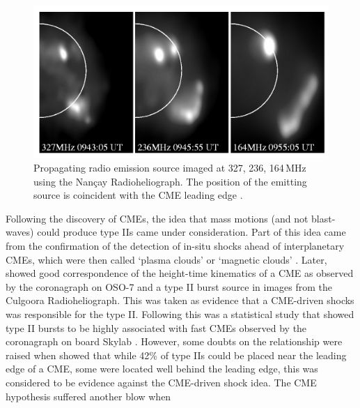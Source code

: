 \begin{figure}
\begin{center}
\includegraphics[scale=1.1, trim=0cm 0cm 0cm 0.5cm]{images/radio_shock.pdf}
\caption[Low frequency image of a radio shock]{Propagating radio emission source imaged at 327, 236, 164\,MHz using the Nan\c{c}ay Radioheliograph. The position of the emitting source is coincident with the CME leading edge \citep{maia2000}.}
\label{fig:maia}
\end{center}
\end{figure}
Following the discovery of CMEs, the idea that mass motions (and not blast-waves) could produce type IIs came under consideration. Part of this idea came from the confirmation of the detection of in-situ shocks ahead of interplanetary CMEs, which were then called `plasma clouds' or `magnetic clouds' \citep{hundhausen1972}. Later, \citet{stewart1974} showed good correspondence of the height-time kinematics of a CME as observed by the coronagraph on OSO-7 and a type II burst source in images from the Culgoora Radioheliograph. This was taken as evidence that a CME-driven shocks was responsible for the type II. Following this was a statistical study that showed type II bursts to be highly associated with fast CMEs observed by the coronagraph on board Skylab \citep{gosling1976}. However, some doubts on the relationship were raised when \citet{robinson1985} showed that while 42\% of type IIs could be placed near the leading edge of a CME, some were located well behind the leading edge, this was considered to be evidence against the CME-driven shock idea. The CME hypothesis suffered another blow when
